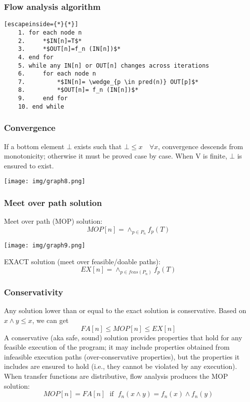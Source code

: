 \documentclass[a4paper, 10pt, titlepage]{article}
\begin{document}
\subsubsection{Flow analysis algorithm}
\begin{lstlisting}[escapeinside={*}{*}]
	1. for each node n
	2. 	   *$IN[n]=T$*
	3.     *$OUT[n]=f_n (IN[n])$*
	4. end for
	5. while any IN[n] or OUT[n] changes across iterations
	6.     for each node n
	7.		   *$IN[n]= \wedge_{p \in pred(n)} OUT[p]$*
	8.         *$OUT[n]= f_n (IN[n])$*
	9.	   end for
	10. end while
\end{lstlisting}

\subsubsection{Convergence}
If a bottom element $\bot$ exists such that $\bot \leq x \quad \forall x$, convergence
descends from monotonicity; otherwise it must be proved case
by case. When V is finite, $\bot$ is ensured to exist.
\begin{center}
\texttt{[image: img/graph8.png]}
\end{center}

\subsubsection{Meet over path solution}
Meet over path (MOP) solution:
$$MOP[n] = \wedge_{p \in P_n} f_p(T)$$
\begin{center}
\texttt{[image: img/graph9.png]}
\end{center}
EXACT solution (meet over feasible/doable paths):
$$EX[n]=\wedge_{p \in feas(P_n)} f_p(T)$$

\subsubsection{Conservativity}	%
Any solution lower than or equal to the exact solution is conservative. Based on $x \wedge y \leq x$, we can get
$$FA[n] \leq MOP[n] \leq EX[n]$$
A conservative (aka safe, sound) solution provides properties that hold for any feasible execution of the program; it may include properties obtained from infeasible execution paths (over-conservative properties), but the properties it includes are ensured to hold (i.e., they cannot be violated by any execution). When transfer functions are distributive, flow analysis produces the MOP solution:
$$MOP[n] = FA[n] \;\text{ if }\; f_n(x \wedge y) = f_n(x) \wedge f_n(y)$$
\end{document}
